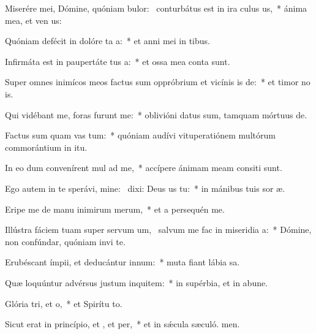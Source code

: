 \item Miserére mei, Dómine, quóniam bulor:~\pscross{} conturbátus est in ira culus us,~* ánima mea, et ven us:
\item Quóniam defécit in dolóre ta a:~* et anni mei in tibus.
\item Infirmáta est in paupertáte tus a:~* et ossa mea conta sunt.
\item Super omnes inimícos meos factus sum oppróbrium et vicínis is de:~* et timor no is.
\item Qui vidébant me, foras furunt  me:~* oblivióni datus sum, tamquam mórtuus  de.
\item Factus sum quam vas tum:~* quóniam audívi vituperatiónem multórum commorántium in itu.
\item In eo dum convenírent mul ad me,~* accípere ánimam meam consiti sunt.
\item Ego autem in te sperávi, mine:~\pscross{} dixi: Deus us  tu:~* in mánibus tuis sor æ.
\item Eripe me de manu inimirum merum,~* et a persequén me.
\item Illústra fáciem tuam super servum um,~\pscross{} salvum me fac in miseridia a:~* Dómine, non confúndar, quóniam invi te.
\item Erubéscant ímpii, et deducántur  innum:~* muta fiant lábia sa.
\item Quæ loquúntur advérsus justum inquitem:~* in supérbia, et in abune.
\item Glória tri, et o,~* et Spirítu to.
\item Sicut erat in princípio, et , et per,~* et in sǽcula sæculó. men.
